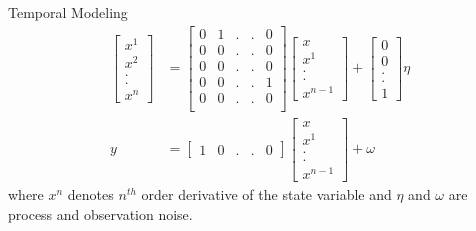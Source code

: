 \documentclass[final]{beamer}
\newlength{\onecolwid}
\begin{document}
\begin{frame}[t]
\begin{columns}[t]
\begin{column}{\onecolwid}
      \begin{block}{Temporal Modeling}
        \begin{align}
          \begin{bmatrix}
            x^{1} \\
            x^{2} \\
            . \\
            .\\
            x^{n}
          \end{bmatrix} &= 
          \begin{bmatrix}
            0 & 1  & . & . & 0\\
            0 & 0  & . & . & 0\\
            0 & 0  & . & . & 0\\
            0& 0 & . & . & 1\\
            0 & 0  & . & . & 0\\
          \end{bmatrix}
          \begin{bmatrix}
            x \\
            x^{1} \\
            . \\
            .\\
            x^{n-1}
          \end{bmatrix}
          +\begin{bmatrix}
            0 \\
            0 \\
            .\\
            .\\
            1
          \end{bmatrix} 
          \eta\\
        y &=  \begin{bmatrix}
          1 &
          0 &
          .&
          .&
           0
          \end{bmatrix} 
        \begin{bmatrix} x \\ x^{1} \\ . \\ .\\ x^{n-1} \end{bmatrix} + \omega
        \end{align}
        where $x^{n}$ denotes $n^{th}$ order derivative of the state variable and $\eta$ and $\omega$ are process and observation noise. 
      \end{block}


\end{column}
\end{columns}
\end{frame}
\end{document}
